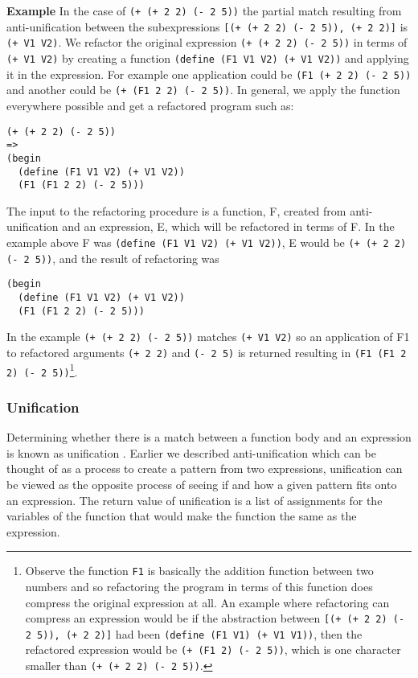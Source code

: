 \documentclass[a4paper,10pt]{article}
\begin{document}
{\bf Example} In the case of \texttt{(+ (+ 2 2) (- 2 5))} the partial match resulting from anti-unification between the subexpressions \texttt{[(+ (+ 2 2) (- 2 5)), (+ 2 2)]} is \texttt{(+ V1 V2)}.  We refactor the original expression \texttt{(+ (+ 2 2) (- 2 5))} in terms of \texttt{(+ V1 V2)} by creating a function \texttt{(define (F1 V1 V2) (+ V1 V2))} and applying it in the expression.  For example one application could be \texttt{(F1 (+ 2 2) (- 2 5))} and another could be \texttt{(+ (F1 2 2) (- 2 5))}.  In general, we apply the function everywhere possible and get a refactored program such as:
\begin{lstlisting}
(+ (+ 2 2) (- 2 5))
=>
(begin
  (define (F1 V1 V2) (+ V1 V2))
  (F1 (F1 2 2) (- 2 5)))
\end{lstlisting}
The input to the refactoring procedure is a function, F, created from anti-unification and an expression, E, which will be refactored in terms of F.  In the example above F was \texttt{(define (F1 V1 V2) (+ V1 V2))}, E would be \texttt{(+ (+ 2 2) (- 2 5))}, and the result of refactoring was 
\begin{lstlisting}
(begin
  (define (F1 V1 V2) (+ V1 V2))
  (F1 (F1 2 2) (- 2 5)))
\end{lstlisting}

In the example \texttt{(+ (+ 2 2) (- 2 5))} matches \texttt{(+ V1 V2)} so an application of F1 to refactored arguments \texttt{(+ 2 2)} and \texttt{(- 2 5)} is returned resulting in \texttt{(F1 (F1 2 2) (- 2 5))}\footnote{Observe the function \texttt{F1} is basically the addition function between two numbers and so refactoring the program in terms of this function does compress the original expression at all.  An example where refactoring can compress an expression would be if the abstraction between \texttt{[(+ (+ 2 2) (- 2 5)), (+ 2 2)]} had been \texttt{(define (F1 V1) (+ V1 V1))}, then the refactored expression would be \texttt{(+ (F1 2) (- 2 5))}, which is one character smaller than \texttt{(+ (+ 2 2) (- 2 5))}.}.  


\subsubsection{Unification}
Determining whether there is a match between a function body and an expression is known as unification \cite{Robinson:1965:MLB:321250.321253}.  Earlier we described anti-unification which can be thought of as a process to create a pattern from two expressions, unification can be viewed as the opposite process of seeing if and how a given pattern fits onto an expression.  The return value of unification is a list of assignments for the variables of the function that would make the function the same as the expression.
\end{document}
